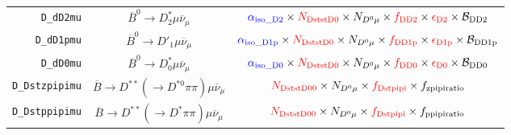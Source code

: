 \begin{landscape}
\begin{table}
\begin{tabular}{r|c|c}
        \texttt{D\_dD2mu} &              $\overline{B}^0 \rightarrow D^*_2 \mu \overline{\nu}_\mu$               &                                                                              $\textcolor{blue}{\alpha_\text{iso\_D2}} \times \textcolor{red}{N_\text{DststD0}} \times N_{D^0 \mu} \times \textcolor{red}{f_\text{DD2}} \times \textcolor{red}{\epsilon_\text{D2}} \times \mathcal{B}_\text{DD2}$                                                                              \\
       \texttt{D\_dD1pmu} &               $\overline{B}^0 \rightarrow D'_1 \mu \overline{\nu}_\mu$               &                                                                            $\textcolor{blue}{\alpha_\text{iso\_D1p}} \times \textcolor{red}{N_\text{DststD0}} \times N_{D^0 \mu} \times \textcolor{red}{f_\text{DD1p}} \times \textcolor{red}{\epsilon_\text{D1p}} \times \mathcal{B}_\text{DD1p}$                                                                            \\
        \texttt{D\_dD0mu} &              $\overline{B}^0 \rightarrow D^*_0 \mu \overline{\nu}_\mu$               &                                                                              $\textcolor{blue}{\alpha_\text{iso\_D0}} \times \textcolor{red}{N_\text{DststD0}} \times N_{D^0 \mu} \times \textcolor{red}{f_\text{DD0}} \times \textcolor{red}{\epsilon_\text{D0}} \times \mathcal{B}_\text{DD0}$                                                                              \\
   \texttt{D\_Dstzpipimu} & $\overline{B} \rightarrow D^{**} (\rightarrow D^{*0} \pi\pi) \mu \overline{\nu}_\mu$ &                                                                                                                          $\textcolor{red}{N_\text{DststD00}} \times N_{D^0 \mu} \times \textcolor{red}{f_\text{Dstpipi}} \times f_\text{zpipiratio}$                                                                                                                          \\
   \texttt{D\_Dstppipimu} &  $\overline{B} \rightarrow D^{**} (\rightarrow D^* \pi\pi) \mu \overline{\nu}_\mu$   &                                                                                                                          $\textcolor{red}{N_\text{DststD00}} \times N_{D^0 \mu} \times \textcolor{red}{f_\text{Dstpipi}} \times f_\text{ppipiratio}$                                                                                                                          \\

\end{tabular}
\end{table}
\end{landscape}
